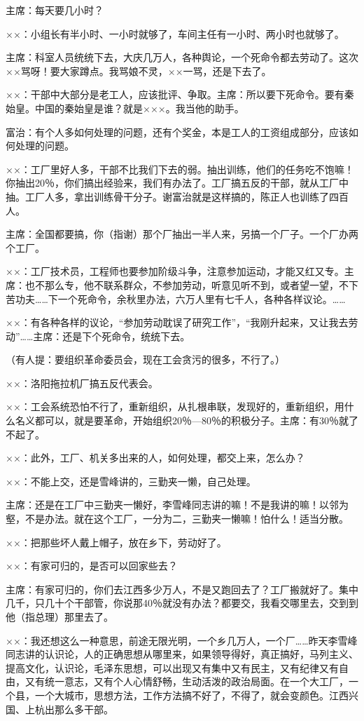 主席：每天要几小时？

××：小组长有半小时、一小时就够了，车间主任有一小时、两小时也就够了。

主席：科室人员统统下去，大庆几万人，各种舆论，一个死命令都去劳动了。这次××骂呀！要大家蹲点。我骂娘不灵，××一骂，还是下去了。

××：干部中大部分是老工人，应该批评、争取。主席：所以要下死命令。要有秦始皇。中国的秦始皇是谁？就是×××。我当他的助手。

富治：有个人多如何处理的问题，还有个奖金，本是工人的工资组成部分，应该如何处理的问题。

××：工厂里好人多，干部不比我们下去的弱。抽出训练，他们的任务吃不饱嘛！你抽出20％，你们搞出经验来，我们有办法了。工厂搞五反的干部，就从工厂中抽。工厂人多，拿出训练骨干分子。谢富治就是这样搞的，陈正人也训练了四百人。

主席：全国都要搞，你（指谢）那个厂抽出一半人来，另搞一个厂子。一个厂办两个工厂。

××：工厂技术员，工程师也要参加阶级斗争，注意参加运动，才能又红又专。主席：也不那么专，他不联系群众，不参加劳动，听意见听不到，或者望一望，不下苦功夫……下一个死命令，余秋里办法，六万人里有七千人，各种各样议论。……

××：有各种各样的议论，“参加劳动耽误了研究工作”，“我刚升起来，又让我去劳动”……主席：还是下个死命令，统统下去。

（有人提：要组织革命委员会，现在工会贪污的很多，不行了。）

××：洛阳拖拉机厂搞五反代表会。

××：工会系统恐怕不行了，重新组织，从扎根串联，发现好的，重新组织，用什么名义都可以，就是要革命，开始组织20％—80％的积极分子。主席：有30％就了不起了。

××：此外，工厂、机关多出来的人，如何处理，都交上来，怎么办？

××：不能上交，还是雪峰讲的，三勤夹一懒，自己处理。

主席：还是在工厂中三勤夹一懒好，李雪峰同志讲的嘛！不是我讲的嘛！以邻为壑，不是办法。就在这个工厂，一分为二，三勤夹一懒嘛！怕什么！适当分散。

××：把那些坏人戴上帽子，放在乡下，劳动好了。

××：有家可归的，是否可以回家些去？

主席：有家可归的，你们去江西多少万人，不是又跑回去了？工厂搬就好了。集中几千，只几十个干部管，你说那40％就没有办法？都要交，我看交哪里去，交到到他（指总理）那里去了。

××：我还想这么一种意思，前途无限光明，一个乡几万人，一个厂……昨天李雪峰同志讲的认识论，人的正确思想从哪里来，如果领导得好，真正搞好，马列主义、提高文化，认识论，毛泽东思想，可以出现又有集中又有民主，又有纪律又有自由，又有统一意志，又有个人心情舒畅，生动活泼的政治局面。在一个大工厂，一个县，一个大城市，思想方法，工作方法搞不好了，不得了，就会变颜色。江西兴国、上杭出那么多干部。

